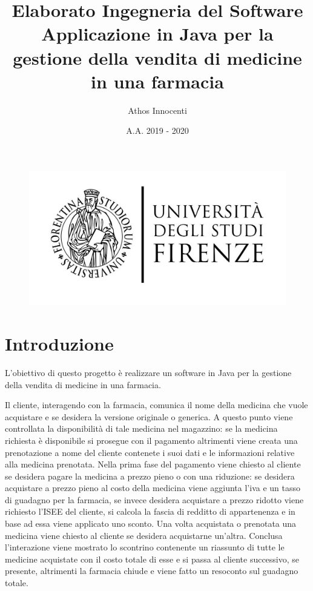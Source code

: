 \documentclass[a4paper, 10pt]{report}
\begin{document}
\begin{figure}[t]
\includegraphics[scale=0.33,angle=0]{logo.png}
\newline
{}
\end{figure}
\title{\Large{Elaborato Ingegneria del Software}\\ \Huge{\textbf{Applicazione in Java per la gestione della vendita di medicine in una farmacia}}}
\author{Athos Innocenti}
\date{A.A. 2019 - 2020}
\maketitle
\tableofcontents
\chapter{Introduzione}
L'obiettivo di questo progetto è realizzare un software in Java per la gestione della vendita di medicine in una farmacia.

Il cliente, interagendo con la farmacia, comunica il nome della medicina che vuole acquistare e se desidera la versione originale o generica. A questo punto viene controllata la disponibilità di tale medicina nel magazzino: se la medicina richiesta è disponibile si prosegue con il pagamento altrimenti viene creata una prenotazione a nome del cliente contenete i suoi dati e le informazioni relative alla medicina prenotata. Nella prima fase del pagamento viene chiesto al cliente se desidera pagare la medicina a prezzo pieno o con una riduzione: se desidera acquistare a prezzo pieno al costo della medicina viene aggiunta l'iva e un tasso di guadagno per la farmacia, se invece desidera acquistare a prezzo ridotto viene richiesto l'ISEE del cliente, si calcola la fascia di redditto di appartenenza e in base ad essa viene applicato uno sconto. Una volta acquistata o prenotata una medicina viene chiesto al cliente se desidera acquistarne un'altra. Conclusa l'interazione viene mostrato lo scontrino contenente un riassunto di tutte le medicine acquistate con il costo totale di esse e si passa al cliente successivo, se presente, altrimenti la farmacia chiude e viene fatto un resoconto sul guadagno totale.
\end{document}
